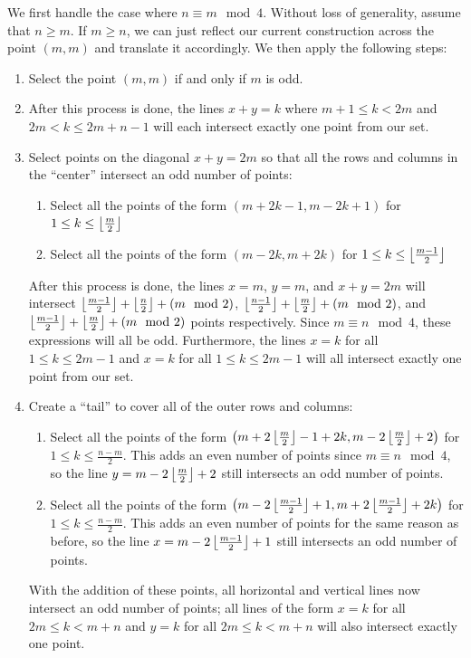 \documentclass[10pt]{../usamts}
\begin{document}
\begin{solution}
\clearpage
We first handle the case where $n \equiv m \mod 4$. Without loss of generality, assume that $n \geq m$. If $m \geq n$, we can just reflect our current construction across the point $(m,m)$ and translate it accordingly. We then apply the following steps:
\begin{enumerate}
    \item Select the point $(m,m)$ if and only if $m$ is odd.
    \item \mainaxis
    After this process is done, the lines $x+y = k$ where $m+1 \leq k < 2m$ and $2m < k \leq 2m+n-1$ will each intersect exactly one point from our set.
    \item Select points on the diagonal $x+y = 2m$ so that all the rows and columns in the ``center'' intersect an odd number of points:
    \begin{enumerate}
        \item Select all the points of the form $(m+2k-1,m-2k+1)$ for $1 \leq k \leq \left\lfloor \frac{m}{2} \right\rfloor$
        \item Select all the points of the form $(m-2k,m+2k)$ for $1 \leq k \leq \left\lfloor \frac{m-1}{2} \right\rfloor$
    \end{enumerate}
    After this process is done, the lines $x=m$, $y=m$, and $x+y = 2m$ will intersect $\left\lfloor \frac{m-1}{2} \right\rfloor + \left\lfloor \frac{n}{2} \right\rfloor + (m \mod 2)$, $\left\lfloor \frac{n-1}{2} \right\rfloor + \left\lfloor \frac{m}{2} \right\rfloor + (m \mod 2)$, and $\left\lfloor \frac{m-1}{2} \right\rfloor + \left\lfloor \frac{m}{2} \right\rfloor + (m \mod 2)$ points respectively. Since $m \equiv n \mod 4$, these expressions will all be odd. Furthermore, the lines $x=k$ for all $1 \leq k \leq 2m-1$ and $x=k$ for all $1 \leq k \leq 2m-1$ will all intersect exactly one point from our set.
    \item Create a ``tail'' to cover all of the outer rows and columns:
    \begin{enumerate}
        \item Select all the points of the form $\left(  m+2\left\lfloor \frac{m}{2} \right\rfloor-1+2k, m-2\left\lfloor \frac{m}{2} \right\rfloor+2  \right)$ for $1 \leq k \leq \frac{n-m}{2}$. This adds an even number of points since $m \equiv n \mod 4$, so the line $y = m-2\left\lfloor \frac{m}{2} \right\rfloor+2$ still intersects an odd number of points.
        \item Select all the points of the form $\left(  m-2\left\lfloor \frac{m-1}{2} \right\rfloor+1, m+2\left\lfloor \frac{m-1}{2} \right\rfloor+2k  \right)$ for $1 \leq k \leq \frac{n-m}{2}$. This adds an even number of points for the same reason as before, so the line $x = m-2\left\lfloor \frac{m-1}{2} \right\rfloor+1$ still intersects an odd number of points.
    \end{enumerate}
    With the addition of these points, all horizontal and vertical lines now intersect an odd number of points; all lines of the form $x = k$ for all $2m \leq k < m+n$ and $y=k$ for all $2m \leq k < m+n$ will also intersect exactly one point.
    

\end{enumerate}
\end{solution}
\end{document}

